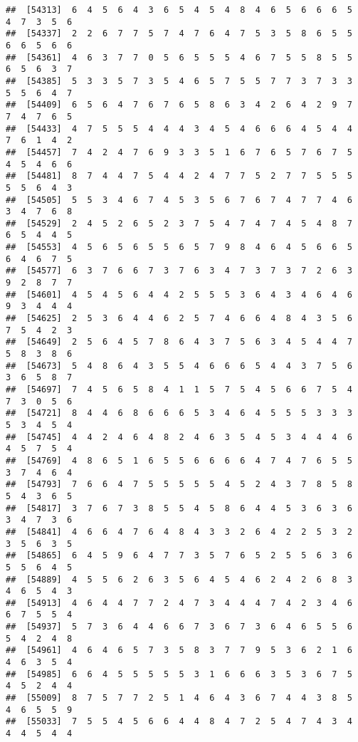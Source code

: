 \documentclass[
]{book}
\begin{document}
\begin{verbatim}
##  [54313]  6  4  5  6  4  3  6  5  4  5  4  8  4  6  5  6  6  6  5  4  7  3  5  6
##  [54337]  2  2  6  7  7  5  7  4  7  6  4  7  5  3  5  8  6  5  5  6  6  5  6  6
##  [54361]  4  6  3  7  7  0  5  6  5  5  5  4  6  7  5  5  8  5  5  6  5  6  3  7
##  [54385]  5  3  3  5  7  3  5  4  6  5  7  5  5  7  7  3  7  3  3  5  5  6  4  7
##  [54409]  6  5  6  4  7  6  7  6  5  8  6  3  4  2  6  4  2  9  7  7  4  7  6  5
##  [54433]  4  7  5  5  5  4  4  4  3  4  5  4  6  6  6  4  5  4  4  7  6  1  4  2
##  [54457]  7  4  2  4  7  6  9  3  3  5  1  6  7  6  5  7  6  7  5  4  5  4  6  6
##  [54481]  8  7  4  4  7  5  4  4  2  4  7  7  5  2  7  7  5  5  5  5  5  6  4  3
##  [54505]  5  5  3  4  6  7  4  5  3  5  6  7  6  7  4  7  7  4  6  3  4  7  6  8
##  [54529]  2  4  5  2  6  5  2  3  7  5  4  7  4  7  4  5  4  8  7  6  5  4  4  5
##  [54553]  4  5  6  5  6  5  5  6  5  7  9  8  4  6  4  5  6  6  5  6  4  6  7  5
##  [54577]  6  3  7  6  6  7  3  7  6  3  4  7  3  7  3  7  2  6  3  9  2  8  7  7
##  [54601]  4  5  4  5  6  4  4  2  5  5  5  3  6  4  3  4  6  4  6  9  3  4  4  4
##  [54625]  2  5  3  6  4  4  6  2  5  7  4  6  6  4  8  4  3  5  6  7  5  4  2  3
##  [54649]  2  5  6  4  5  7  8  6  4  3  7  5  6  3  4  5  4  4  7  5  8  3  8  6
##  [54673]  5  4  8  6  4  3  5  5  4  6  6  6  5  4  4  3  7  5  6  3  6  5  8  7
##  [54697]  7  4  5  6  5  8  4  1  1  5  7  5  4  5  6  6  7  5  4  7  3  0  5  6
##  [54721]  8  4  4  6  8  6  6  6  5  3  4  6  4  5  5  5  3  3  3  5  3  4  5  4
##  [54745]  4  4  2  4  6  4  8  2  4  6  3  5  4  5  3  4  4  4  6  4  5  7  5  4
##  [54769]  4  8  6  5  1  6  5  5  6  6  6  6  4  7  4  7  6  5  5  3  7  4  6  4
##  [54793]  7  6  6  4  7  5  5  5  5  5  4  5  2  4  3  7  8  5  8  5  4  3  6  5
##  [54817]  3  7  6  7  3  8  5  5  4  5  8  6  4  4  5  3  6  3  6  3  4  7  3  6
##  [54841]  4  6  6  4  7  6  4  8  4  3  3  2  6  4  2  2  5  3  2  3  5  6  3  5
##  [54865]  6  4  5  9  6  4  7  7  3  5  7  6  5  2  5  5  6  3  6  5  5  6  4  5
##  [54889]  4  5  5  6  2  6  3  5  6  4  5  4  6  2  4  2  6  8  3  4  6  5  4  3
##  [54913]  4  6  4  4  7  7  2  4  7  3  4  4  4  7  4  2  3  4  6  6  7  5  5  4
##  [54937]  5  7  3  6  4  4  6  6  7  3  6  7  3  6  4  6  5  5  6  5  4  2  4  8
##  [54961]  4  6  4  6  5  7  3  5  8  3  7  7  9  5  3  6  2  1  6  4  6  3  5  4
##  [54985]  6  6  4  5  5  5  5  5  3  1  6  6  6  3  5  3  6  7  5  4  5  2  4  4
##  [55009]  8  7  5  7  7  2  5  1  4  6  4  3  6  7  4  4  3  8  5  4  6  5  5  9
##  [55033]  7  5  5  4  5  6  6  4  4  8  4  7  2  5  4  7  4  3  4  4  4  5  4  4

\end{verbatim}
\end{document}
